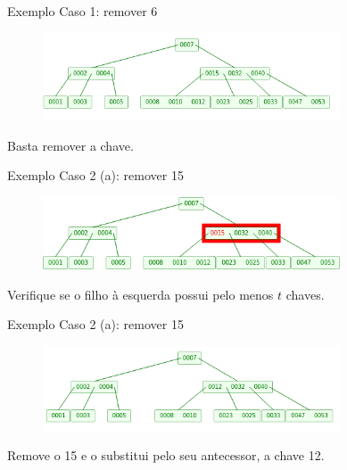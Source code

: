 \documentclass[aspectratio=169]{beamer}
\begin{document}
{%

\begin{frame}{Exemplo}
Caso 1: remover 6
\begin{figure}[!h]
\centering
   \includegraphics[width=250pt]{imagens/remocao3.png}
  \label{fig_remocao3}
\end{figure} 
Basta remover a chave.
\end{frame}


\begin{frame}{Exemplo}
Caso 2 (a): remover 15
\begin{figure}[!h]
\centering
   \includegraphics[width=250pt]{imagens/remocao4.png}
  \label{fig_remocao4}
\end{figure} 
Verifique se o filho à esquerda possui pelo menos $t$ chaves.
\end{frame}



\begin{frame}{Exemplo}
Caso 2 (a): remover 15
\begin{figure}[!h]
\centering
   \includegraphics[width=250pt]{imagens/remocao5.png}
  \label{fig_remocao5}
\end{figure} 
Remove o 15 e o substitui pelo seu antecessor, a chave 12.
\end{frame}


}
\end{document}
